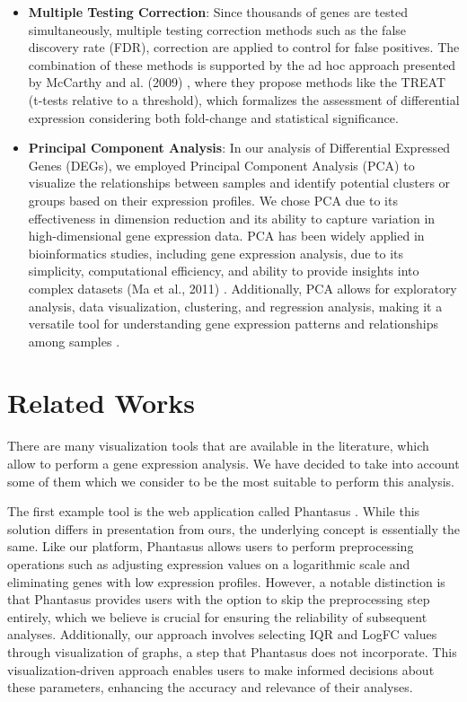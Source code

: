 \documentclass[
	a4paper, %
	10pt, %
	unnumberedsections, %
	twoside, %
]{LTJournalArticle}
\begin{document}
\begin{itemize}
\item \textbf{Multiple Testing Correction}: Since thousands of genes are tested simultaneously, multiple testing correction methods such as the false discovery rate (FDR), correction are applied to control for false positives. The combination of these methods is supported by the ad hoc approach presented by McCarthy and al. (2009) \cite{mccarthy2009testing}, where they propose methods like the TREAT (t-tests relative to a threshold), which formalizes the assessment of differential expression considering both fold-change and statistical significance. 

\item \textbf{Principal Component Analysis}: In our analysis of Differential Expressed Genes (DEGs), we employed Principal Component Analysis (PCA) to visualize the relationships between samples and identify potential clusters or groups based on their expression profiles. We chose PCA due to its effectiveness in dimension reduction and its ability to capture variation in high-dimensional gene expression data. PCA has been widely applied in bioinformatics studies, including gene expression analysis, due to its simplicity, computational efficiency, and ability to provide insights into complex datasets (Ma et al., 2011) \cite{ma2011principal}. Additionally, PCA allows for exploratory analysis, data visualization, clustering, and regression analysis, making it a versatile tool for understanding gene expression patterns and relationships among samples \cite{ma2011principal}.
    
\end{itemize}


\section{Related Works}
There are many visualization tools that are available in the literature, which allow to perform a gene expression analysis. We have decided to take into account some of them which we consider to be the most suitable to perform this analysis.

The first example tool is the web application called Phantasus \cite{Kleverov2022.12.10.519861}. While this solution differs in presentation from ours, the underlying concept is essentially the same. Like our platform, Phantasus allows users to perform preprocessing operations such as adjusting expression values on a logarithmic scale and eliminating genes with low expression profiles. However, a notable distinction is that Phantasus provides users with the option to skip the preprocessing step entirely, which we believe is crucial for ensuring the reliability of subsequent analyses. Additionally, our approach involves selecting IQR and LogFC values through visualization of graphs, a step that Phantasus does not incorporate. This visualization-driven approach enables users to make informed decisions about these parameters, enhancing the accuracy and relevance of their analyses.
\end{document}
